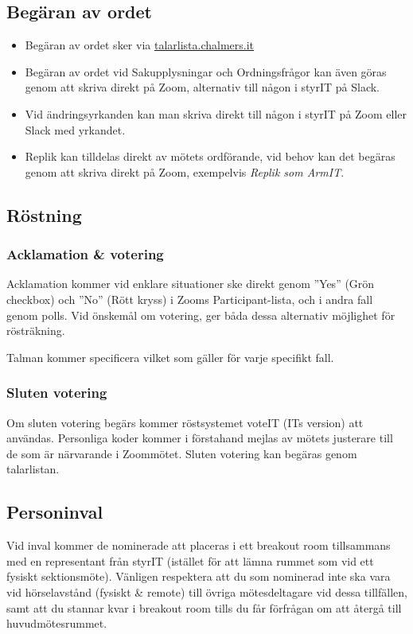 \documentclass[11pt, noincludeaddress, nopagination]{classes/cthit}
\begin{document}
\subsection*{Begäran av ordet}
\begin{itemize}
    \item Begäran av ordet sker via \href{https://talarlista.chalmers.it/user}{talarlista.chalmers.it}
    \item Begäran av ordet vid Sakupplysningar och Ordningsfrågor kan även göras genom att skriva direkt på Zoom, alternativ till någon i styrIT på Slack.
    \item Vid ändringsyrkanden kan man skriva direkt till någon i styrIT på Zoom eller Slack med yrkandet.
    \item Replik kan tilldelas direkt av mötets ordförande, vid behov kan det begäras genom att skriva direkt på Zoom, exempelvis \textit{Replik som ArmIT}.
\end{itemize}

\subsection*{Röstning}

\begin{adjustwidth}{0.3 cm}{0cm}
\subsubsection*{Acklamation \& votering}
Acklamation kommer vid enklare situationer ske direkt genom ''Yes'' (Grön checkbox) och ''No'' (Rött kryss) i Zooms Participant-lista, och i andra fall genom polls. Vid önskemål om votering, ger båda dessa alternativ möjlighet för rösträkning.

Talman kommer specificera vilket som gäller för varje specifikt fall.

\subsubsection*{Sluten votering}
Om sluten votering begärs kommer röstsystemet voteIT (ITs version) att användas. Personliga koder kommer i förstahand mejlas av mötets justerare till de som är närvarande i Zoommötet. Sluten votering kan begäras genom talarlistan.
\end{adjustwidth}

\subsection*{Personinval}
Vid inval kommer de nominerade att placeras i ett breakout room tillsammans med en representant från styrIT (istället för att lämna rummet som vid ett fysiskt sektionsmöte). Vänligen respektera att du som nominerad inte ska vara vid hörselavstånd (fysiskt \& remote) till övriga mötesdeltagare vid dessa tillfällen, samt att du stannar kvar i breakout room tills du får förfrågan om att återgå till huvudmötesrummet.
\end{document}
